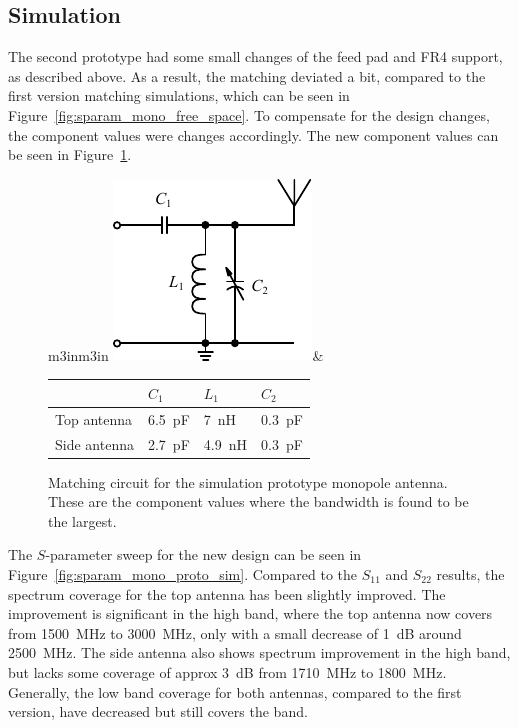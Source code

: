 \FloatBarrier
\subsection{Simulation} %
The second prototype had some small changes of the feed pad and FR4 support, as described above. As a result, the matching deviated a bit, compared to the first version matching simulations, which can be seen in Figure~\ref{fig:sparam_mono_free_space}. To compensate for the design changes, the component values were changes accordingly. The new component values can be seen in Figure~\ref{fig:mono_proto_sim_matching}.

\begin{figure}[htbp]
        \centering
        \begin{tabular}{m{3in}m{3in}}
            \centering
            \includegraphics{img/tech_sol/schematic_tuning_1}&
            \centering
            \footnotesize
            \begin{tabular}{|l|l|l|l|}
                \hline
                & $C_1$ & $L_1$ & $C_2$ \\
                \hline
                Top antenna & \SI{6.5}{pF} & \SI{7}{nH} & \SI{0.3}{pF} \\
                Side antenna & \SI{2.7}{pF} & \SI{4.9}{nH} & \SI{0.3}{pF} \\
                \hline
            \end{tabular}
        \end{tabular}
    \caption{Matching circuit for the simulation prototype monopole antenna. These are the component values where the bandwidth is found to be the largest.}
    \label{fig:mono_proto_sim_matching}
\end{figure}

The $S$-parameter sweep for the new design can be seen in Figure~\ref{fig:sparam_mono_proto_sim}. Compared to the $S_{11}$ and $S_{22}$ results, the spectrum coverage for the top antenna has been slightly improved. The improvement is significant in the high band, where the top antenna now covers from \SI{1500}{MHz} to \SI{3000}{MHz}, only with a small decrease of \SI{1}{dB} around \SI{2500}{MHz}. The side antenna also shows spectrum improvement in the high band, but lacks some coverage of approx \SI{3}{dB} from \SI{1710}{MHz} to \SI{1800}{MHz}. Generally, the low band coverage for both antennas, compared to the first version, have decreased but still covers the band.

